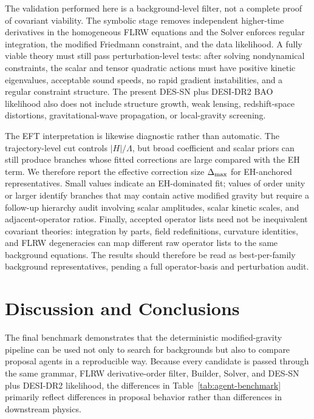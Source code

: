 \documentclass[aps,prd,twocolumn,superscriptaddress,nofootinbib,longbibliography]{revtex4-2}
\begin{document}
The validation performed here is a background-level filter, not a complete proof of covariant viability.  The symbolic stage removes independent higher-time derivatives in the homogeneous FLRW equations and the Solver enforces regular integration, the modified Friedmann constraint, and the data likelihood.  A fully viable theory must still pass perturbation-level tests: after solving nondynamical constraints, the scalar and tensor quadratic actions must have positive kinetic eigenvalues, acceptable sound speeds, no rapid gradient instabilities, and a regular constraint structure.  The present DES-SN plus DESI-DR2 BAO likelihood also does not include structure growth, weak lensing, redshift-space distortions, gravitational-wave propagation, or local-gravity screening.

The EFT interpretation is likewise diagnostic rather than automatic.  The trajectory-level cut controls $|H|/\Lambda$, but broad coefficient and scalar priors can still produce branches whose fitted corrections are large compared with the EH term.  We therefore report the effective correction size $\Delta_{\rm max}$ for EH-anchored representatives.  Small values indicate an EH-dominated fit; values of order unity or larger identify branches that may contain active modified gravity but require a follow-up hierarchy audit involving scalar amplitudes, scalar kinetic scales, and adjacent-operator ratios.  Finally, accepted operator lists need not be inequivalent covariant theories: integration by parts, field redefinitions, curvature identities, and FLRW degeneracies can map different raw operator lists to the same background equations.  The results should therefore be read as best-per-family background representatives, pending a full operator-basis and perturbation audit.



\section{Discussion and Conclusions}
\label{sec:conclusion}

The final benchmark demonstrates that the deterministic modified-gravity pipeline can be used not only to search for backgrounds but also to compare proposal agents in a reproducible way.  Because every candidate is passed through the same grammar, FLRW derivative-order filter, Builder, Solver, and DES-SN plus DESI-DR2 likelihood, the differences in Table~\ref{tab:agent-benchmark} primarily reflect differences in proposal behavior rather than differences in downstream physics.
\end{document}
